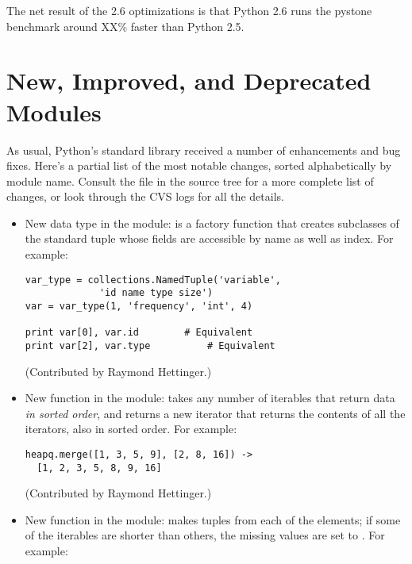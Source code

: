 \documentclass{howto}
\begin{document}
The net result of the 2.6 optimizations is that Python 2.6 runs the
pystone benchmark around XX\% faster than Python 2.5.


\section{New, Improved, and Deprecated Modules}

As usual, Python's standard library received a number of enhancements and
bug fixes.  Here's a partial list of the most notable changes, sorted
alphabetically by module name. Consult the
 file in the source tree for a more
complete list of changes, or look through the CVS logs for all the
details.

\begin{itemize}

\item New data type in the  module:
 is a factory function that
creates subclasses of the standard tuple whose fields are accessible
by name as well as index.  For example:

\begin{verbatim}
var_type = collections.NamedTuple('variable', 
             'id name type size')
var = var_type(1, 'frequency', 'int', 4)

print var[0], var.id		# Equivalent
print var[2], var.type          # Equivalent
\end{verbatim}

(Contributed by Raymond Hettinger.)

\item New function in the  module:
takes any number of iterables that return data 
\emph{in sorted order}, 
and 
returns a new iterator that returns the contents of
all the iterators, also in sorted order.  For example:

\begin{verbatim}
heapq.merge([1, 3, 5, 9], [2, 8, 16]) ->
  [1, 2, 3, 5, 8, 9, 16]
\end{verbatim}

(Contributed by Raymond Hettinger.)

\item New function in the  module:
makes tuples from each of the elements; if some of the iterables
are shorter than others, the missing values 
are set to .  For example:


\end{itemize}
\end{document}
